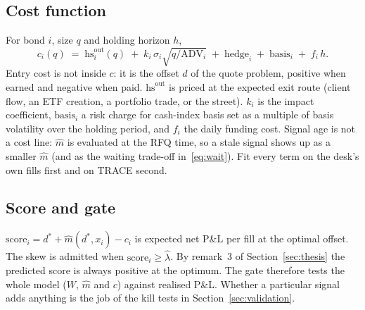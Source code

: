 \documentclass[11pt,letterpaper]{article}
\newcommand{\hs}{\mathrm{hs}}             %
\newcommand{\ADV}{\mathrm{ADV}}
\begin{document}
\subsection{Cost function}
For bond $i$, size $q$ and holding horizon $h$,
\begin{equation}
c_i(q)\;=\;\hs^{\mathrm{out}}_i(q)\;+\;k_i\,\sigma_i\sqrt{q/\ADV_i}\;+\;\mathrm{hedge}_i\;+\;\mathrm{basis}_i\;+\;f_i\,h .
\label{eq:cost}
\end{equation}
Entry cost is not inside $c$: it is the offset $d$ of the quote problem, positive when earned and negative when paid. $\hs^{\mathrm{out}}$ is priced at the expected exit route (client flow, an ETF creation, a portfolio trade, or the street). $k_i$ is the impact coefficient, $\mathrm{basis}_i$ a risk charge for cash-index basis set as a multiple of basis volatility over the holding period, and $f_i$ the daily funding cost. Signal age is not a cost line: $\hat m$ is evaluated at the RFQ time, so a stale signal shows up as a smaller $\hat m$ (and as the waiting trade-off in~\eqref{eq:wait}). Fit every term on the desk's own fills first and on TRACE second.

\subsection{Score and gate}
$\mathrm{score}_i=d^{*}+\hat m(d^{*},x_i)-c_i$ is expected net P\&L per fill at the optimal offset. The skew is admitted when $\mathrm{score}_i\ge\hat\lambda$. By remark~3 of Section~\ref{sec:thesis} the predicted score is always positive at the optimum. The gate therefore tests the whole model ($W$, $\hat m$ and $c$) against realised P\&L. Whether a particular signal adds anything is the job of the kill tests in Section~\ref{sec:validation}.
\end{document}
